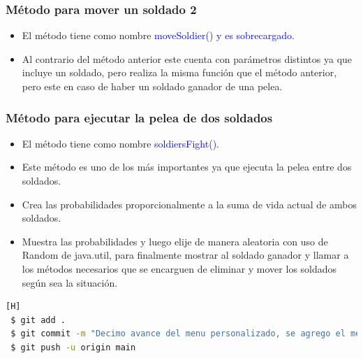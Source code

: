 \documentclass{article}
\begin{document}
\subsubsection{Método para mover un soldado 2}
\begin{itemize}
    \item El método tiene como nombre \textcolor{blue}{moveSoldier() y es sobrecargado}.
    \item Al contrario del método anterior este cuenta con parámetros distintos ya que incluye un soldado, pero realiza la misma función que el método anterior, pero este en caso de haber un soldado ganador de una pelea.
\end{itemize}



\subsubsection{Método para ejecutar la pelea de dos soldados}
\begin{itemize}
    \item El método tiene como nombre \textcolor{blue}{soldiersFight()}.
    \item Este método es uno de los más importantes ya que ejecuta la pelea entre dos soldados.
    \item Crea las probabilidades proporcionalmente a la suma de vida actual de ambos soldados.
    \item Muestra las probabilidades y luego elije de manera aleatoria con uso de Random de java.util, para finalmente mostrar al soldado ganador y llamar a los métodos necesarios que se encarguen de eliminar y mover los soldados según sea la situación.
\end{itemize}


\begin{lstlisting}[language=bash,caption={Commit \href{https://github.com/hernanchoquehuanca/fp2-23b/commit/b3523d07a3d8f518091cb0476244ef750107db75}{b3523d0}: Siendo este el último commit referente al trabajo del código (el último fue revisión)}][H]
 $ git add .
 $ git commit -m "Decimo avance del menu personalizado, se agrego el metodo para salir"			
 $ git push -u origin main
\end{lstlisting}

     

\end{document}
